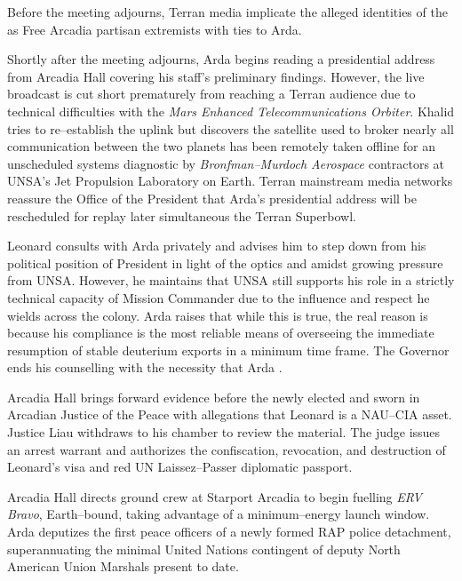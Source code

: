 Before the meeting adjourns, Terran media implicate the alleged identities of the  as Free Arcadia partisan extremists with ties to Arda.

Shortly after the meeting adjourns, Arda begins reading a presidential address from Arcadia Hall covering his staff's preliminary findings. However, the live broadcast is cut short prematurely from reaching a Terran audience due to technical difficulties with the {\it Mars Enhanced Telecommunications Orbiter}. Khalid tries to re--establish the uplink but discovers the satellite used to broker nearly all communication between the two planets has been remotely taken offline for an unscheduled systems diagnostic by {\it Bronfman--Murdoch Aerospace} contractors at UNSA's Jet Propulsion Laboratory on Earth. Terran mainstream media networks reassure the Office of the President that Arda's presidential address will be rescheduled for replay later simultaneous the Terran Superbowl.

Leonard consults with Arda privately and advises him to step down from his political position of President in light of the optics and amidst growing pressure from UNSA. However, he maintains that UNSA still supports his role in a strictly technical capacity of Mission Commander due to the influence and respect he wields across the colony. Arda raises that while this is true, the real reason is because his compliance is the most reliable means of overseeing the immediate resumption of stable deuterium exports in a minimum time frame. The Governor ends his counselling with the necessity that Arda .
\StopTimelineDate

Arcadia Hall brings forward evidence before the newly elected and sworn in Arcadian Justice of the Peace with allegations that Leonard is a NAU--CIA asset. Justice Liau withdraws to his chamber to review the material. The judge issues an arrest warrant and authorizes the confiscation, revocation, and destruction of Leonard's visa and red UN Laissez--Passer diplomatic passport.

Arcadia Hall directs ground crew at Starport Arcadia to begin fuelling {\it ERV Bravo}, Earth--bound, taking advantage of a minimum--energy launch window. Arda deputizes the first peace officers of a newly formed RAP police detachment, superannuating the minimal United Nations contingent of deputy North American Union Marshals present to date.


